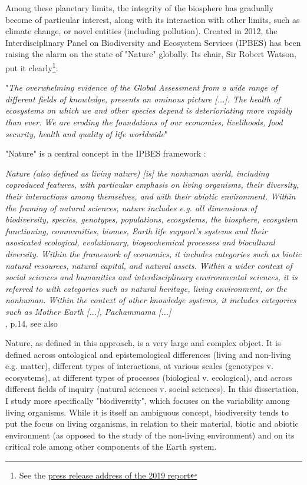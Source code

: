 Among these planetary limits, the integrity of the biosphere has gradually become of particular interest, along with its interaction with other limits, such as climate change, or novel entities (including pollution). Created in 2012, the Interdisciplinary Panel on Biodiversity and Ecosystem Services (IPBES) has been raising the alarm on the state of "Nature" globally. Its chair, Sir Robert Watson, put it clearly\footnote{See the \href{https://www.ipbes.net/news/Media-Release-Global-Assessment}{press release address of the 2019 report}}:
\begin{displayquote}
"\textit{The overwhelming evidence of the \cite{ipbes_2022_6417333} Global Assessment from a wide range of different fields of knowledge, presents an ominous picture [...]. The health of ecosystems on which we and other species depend is deterioriating more rapidly than ever. We are eroding the foundations of our economies, livelihoods, food security, health and quality of life worldwide}"
\end{displayquote}

"Nature" is a central concept in the IPBES framework \citep{ipbes_2022_6417333}:

\begin{displayquote}
\textit{Nature (also defined as living nature) [is] the nonhuman world, including coproduced features, with particular emphasis on living organisms, their diversity, their interactions among themselves, and with their abiotic environment. Within the framing of natural sciences, nature includes e.g. all dimensions of biodiversity, species, genotypes, populations, ecosystems, the biosphere, ecosystem functioning, communities, biomes, Earth life support's systems and their asosicated ecological, evolutionary, biogeochemical processes and biocultural diversity. Within the framework of economics, it includes categories such as biotic natural resources, natural capital, and natural assets. Within a wider context of social sciences and humanities and interdisciplinary environmental sciences, it is referred to with categories such as natural heritage, living environment, or the nonhuman. Within the context of other knowledge systems, it includes categories such as Mother Earth [...], Pachammama [...]}\\
\hspace*{\fill} \small{\cite{ipbes_2022_6417333}, p.14, see also \cite{DIAZ20151}}
\end{displayquote}

Nature, as defined in this approach, is a very large and complex object.
It is defined across ontological and epistemological differences (living and non-living e.g. matter), different types of interactions, at various scales (genotypes v. ecosystems), at different types of processes (biological v. ecological), and across different fields of inquiry (natural sciences v. social sciences). In this dissertation, I study more specifically "biodiversity", which focuses on the variability among living organisms. While it is itself an ambiguous concept, biodiversity tends to put the focus on living organisms, in relation to their material, biotic and abiotic environment (as opposed to the study of the non-living environment) and on its critical role among other components of the Earth system.

